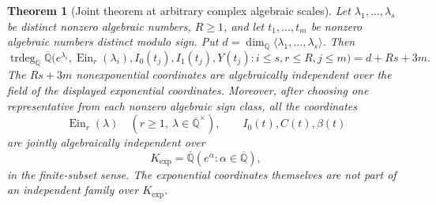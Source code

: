 \documentclass[11pt]{article}
\newtheorem{theorem}{Theorem}[section]
\theoremstyle{definition}
\theoremstyle{remark}
\newcommand{\Ein}{\operatorname{Ein}}
\begin{document}
\begin{theorem}[Joint theorem at arbitrary complex algebraic scales]
\label{cf:joint}\label{pj:joint}
Let $\lambda_1,\ldots,\lambda_s$ be distinct nonzero algebraic numbers,
$R\ge1$, and let $t_1,\ldots,t_m$ be nonzero algebraic numbers distinct
modulo sign. Put $d=\dim_{\mathbb Q}\langle\lambda_1,\ldots,\lambda_s\rangle$.
Then
\[
 \operatorname{trdeg}_{\overline{\mathbb Q}}
 \overline{\mathbb Q}\bigl(e^{\lambda_i},
 \Ein_r(\lambda_i),I_0(t_j),I_1(t_j),Y(t_j):
 i\le s,r\le R,j\le m\bigr)=d+Rs+3m.
\]
The $Rs+3m$ nonexponential coordinates are algebraically independent over
the field of the displayed exponential coordinates. Moreover, after
choosing one representative from each nonzero algebraic sign class,
all the coordinates
\[
 \Ein_r(\lambda)\quad
 (r\ge1,\ \lambda\in\overline{\mathbb Q}^{\times}),
 \qquad I_0(t),C(t),\beta(t)
\]
are jointly algebraically independent over
\[
 K_{\exp}=\overline{\mathbb Q}
             (e^\alpha:\alpha\in\overline{\mathbb Q}),
\]
in the finite-subset sense. The exponential coordinates themselves are
not part of an independent family over $K_{\exp}$.
\end{theorem}
\end{document}
